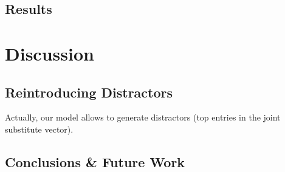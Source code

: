 \documentclass[11pt,letterpaper]{article}
\begin{document}

\subsection{Results}

\section{Discussion}

\subsection{Reintroducing Distractors}
Actually, our model allows to generate distractors (top entries in the joint substitute vector).

\subsection{Conclusions \& Future Work}
\end{document}
